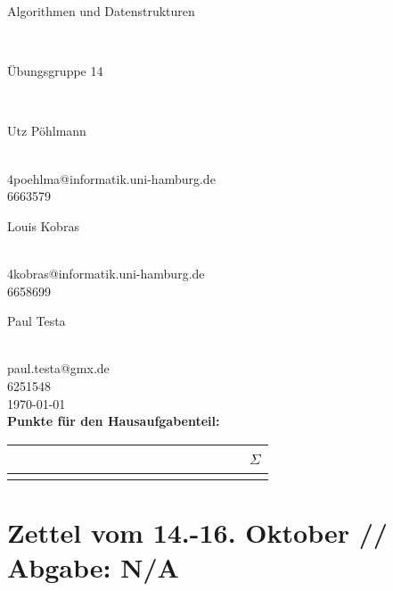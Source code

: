 \documentclass{article}
\begin{document}
\thispagestyle{empty}
\-\vspace{2cm}
\begin{center}
\begin{Huge}
Algorithmen und Datenstrukturen
\end{Huge}\\
\vspace{2cm}
\begin{LARGE}
Übungsgruppe 14
\end{LARGE}\\
\vspace{2cm}
\begin{Large}
Utz Pöhlmann
\end{Large}\\
4poehlma@informatik.uni-hamburg.de\\
6663579\\
\vspace{1cm}
\begin{Large}
Louis Kobras
\end{Large}\\
4kobras@informatik.uni-hamburg.de\\
6658699\\
\vspace{1cm}
\begin{Large}
Paul Testa
\end{Large}\\
paul.testa@gmx.de\\
6251548\\
\vspace{2.5cm}
\today\\
\vspace{2.5cm}
\textbf{Punkte für den Hausaufgabenteil:}\\
\vspace{1cm}
\begin{tabular}{c|c|c|c|c|c}
~~~~&~~~~&~~~~&~~~~&~~~~&$\Sigma$	\\	\hline
	&	 &	  &	   &	&

\end{tabular}
\end{center}

\newpage
{}
\section{Zettel vom 14.-16. Oktober // Abgabe: N/A}
\end{document}
